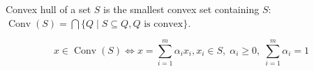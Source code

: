 \begin{conj}
    Convex hull of a set $S$ is the smallest convex set containing $S$: $\operatorname{Conv}{(S)} = \bigcap \{ Q \mid S \subseteq Q, Q \text{ is convex} \}$.
\end{conj}

\begin{theorem}
    \[ 
        x \in \operatorname{Conv}{(S)} \Longleftrightarrow x = \sum^m_{i=1} \alpha_i x_i, x_i \in S, \; \alpha_i \geqslant 0, \; \sum^m_{i=1} \alpha_i = 1
    \]
\end{theorem}